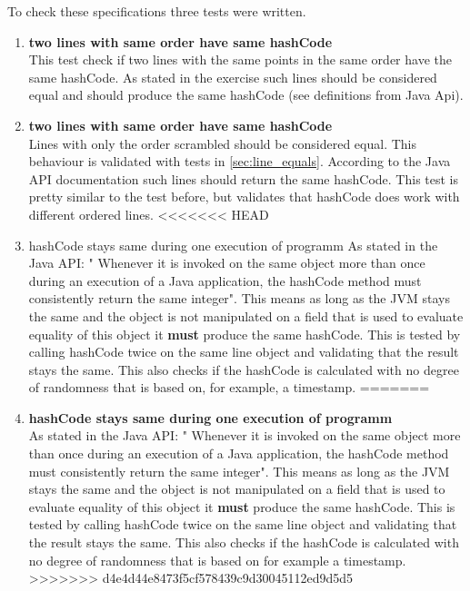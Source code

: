 To check these specifications three tests were written.
\begin{enumerate}
    \item \textbf{two lines with same order have same hashCode} \\
    This test check if two lines with the same points in the same order have the same hashCode. As stated in the exercise such lines should be considered equal and should produce the same hashCode (see definitions from Java Api).
    \item \textbf{two lines with same order have same hashCode} \\
    Lines with only the order scrambled should be considered equal. This behaviour is validated with tests in \ref{sec:line_equals}. According to the Java API documentation such lines should return the same hashCode. This test is pretty similar to the test before, but validates that hashCode does work with different ordered lines.
<<<<<<< HEAD
    \item hashCode stays same during one execution of programm
    As stated in the Java API: " Whenever it is invoked on the same object more than once during an execution of a Java application, the hashCode method must consistently return the same integer". This means as long as the JVM stays the same and the object is not manipulated on a field that is used to evaluate equality of this object it \textbf{must} produce the same hashCode. This is tested by calling hashCode twice on the same line object and validating that the result stays the same. This also checks if the hashCode is calculated with no degree of randomness that is based on, for example, a timestamp.
=======
    \item \textbf{hashCode stays same during one execution of programm} \\
    As stated in the Java API: " Whenever it is invoked on the same object more than once during an execution of a Java application, the hashCode method must consistently return the same integer". This means as long as the JVM stays the same and the object is not manipulated on a field that is used to evaluate equality of this object it \textbf{must} produce the same hashCode. This is tested by calling hashCode twice on the same line object and validating that the result stays the same. This also checks if the hashCode is calculated with no degree of randomness that is based on for example a timestamp.
>>>>>>> d4e4d44e8473f5cf578439c9d30045112ed9d5d5
\end{enumerate}

